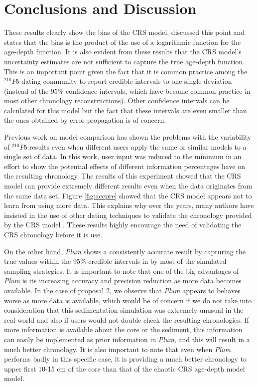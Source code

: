 \documentclass [10pt] {article}
\begin{document}
\section{Conclusions and Discussion}

These results clearly show the bias of the CRS model. 
\citet{Aquino2018} discussed this point and states that the bias is the product of the use of a logarithmic function for the age-depth function. 
It is also evident from these results that the CRS model's uncertainty estimates are not sufficient to capture the true age-depth function. 
This is an important point given the fact that it is common practice among the $^{210}Pb$ dating community to report credible intervals to one single deviation (instead of the 95\% confidence intervals, which have become common practice in most other chronology reconstructions).
Other confidence intervals can be calculated for this model \citep{Sanchez-Cabeza2014} but the fact that these intervals are even smaller than the ones obtained by error propagation \citep{Appleby2001} is of concern. 

Previous work on model comparison \citep{Barsanti2020} has shown the problems with the variability of $^{210}Pb$ results even when different users apply the same or similar models to a single set of data.
In this work, user input was reduced to the minimum in an effort to show the potential effects of different information percentages have on the resulting chronology. 
The results of this experiment showed that the CRS model can provide extremely different results even when the data originates from the same data set. 
Figure \ref{fig:accpre} showed that the CRS model appears not to learn from using more data.
This explains why over the years, many authors have insisted in the use of other dating techniques to validate the chronology provided by the CRS model \citep{Sanchez-Cabeza2012,Barsanti2020,Aquino2020}.
These results highly encourage the need of validating the CRS chronology before it is use.


On the other hand, \textit{Plum} shows a consistently accurate result by capturing the true values within the 95\% credible intervals in by most of the simulated sampling strategies. 
It is important to note that one of the big advantages of \textit{Plum} is its increasing accuracy and precision reduction as more data becomes available.
In the case of proposal 2, we observe that \textit{Plum} appears to behaves worse as more data is available, which would be of concern if we do not take into consideration that this sedimentation simulation was extremely unusual in the real world and also if users would not double check the resulting chronologies. 
If more information is available about the core or the sediment, this information can easily be implemented as prior information in \textit{Plum}, and this will result in a much better chronology.
It is also important to note that even when \textit{Plum} performs badly in this specific case, it is providing a much better chronology to upper first 10-15 cm of the core than that of the chaotic CRS age-depth model model.
\end{document}
